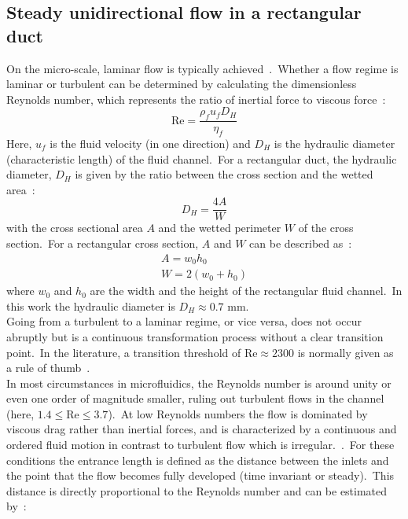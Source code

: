 \subsection{Steady unidirectional flow in a rectangular duct}\label{sub:steadyUnidirectionalFlowInRectangularDuct}
On the micro-scale, laminar flow is typically achieved~\cite{Whitesides2006}.\ Whether a flow regime is laminar or turbulent can be determined by calculating the dimensionless Reynolds number, which represents the ratio of inertial force to viscous force~\cite{White2006}:\
\begin{equation}
	\text{Re} = \frac{\rho_{f}u_{f}D_{H}}{\eta_{f}}
 	\label{eqn:reynoldsNumber}
\end{equation}
Here, $u_{f}$ is the fluid velocity (in one direction) and $D_{H}$ is the hydraulic diameter (characteristic length) of the fluid channel.\ For a rectangular duct, the hydraulic diameter, $D_{H}$ is given by the ratio between the cross section and the wetted area~\cite{GaryLeal1993}:\
\begin{equation}
 	D_{H} = \frac{4A}{W}
 	\label{eqn:hydraulicDiameter}
\end{equation}
with the cross sectional area $A$ and the wetted perimeter $W$ of the cross section.\ For a rectangular cross section, $A$ and $W$ can be described as~\cite{GaryLeal1993}:\
\begin{eqnarray}
	A = w_{0}h_{0} \\
	W = 2(w_{0}+h_{0})
\end{eqnarray} 
where $w_{0}$ and $h_{0}$ are the width and the height of the rectangular fluid channel.\ In this work the hydraulic diameter is $D_{H} \approx 0.7$ mm.\\
Going from a turbulent to a laminar regime, or vice versa, does not occur abruptly but is a continuous transformation process without a clear transition point.\ In the literature, a transition threshold of $\text{Re} \approx 2300$ is normally given as a rule of thumb~\cite{Happel2012}.\\
In most circumstances in microfluidics, the Reynolds number is around unity or even one order of magnitude smaller, ruling out turbulent flows in the channel (here, $1.4 \leq \text{Re} \leq 3.7$).\ At low Reynolds numbers the flow is dominated by viscous drag rather than inertial forces, and is characterized by a continuous and ordered fluid motion in contrast to turbulent flow which is irregular.~\cite{Purcell1977}.\ For these conditions the entrance length is defined as the distance between the inlets and the point that the flow becomes fully developed (time invariant or steady).\ This distance is directly proportional to the Reynolds number and can be estimated by~\cite{Kays2012}:\
